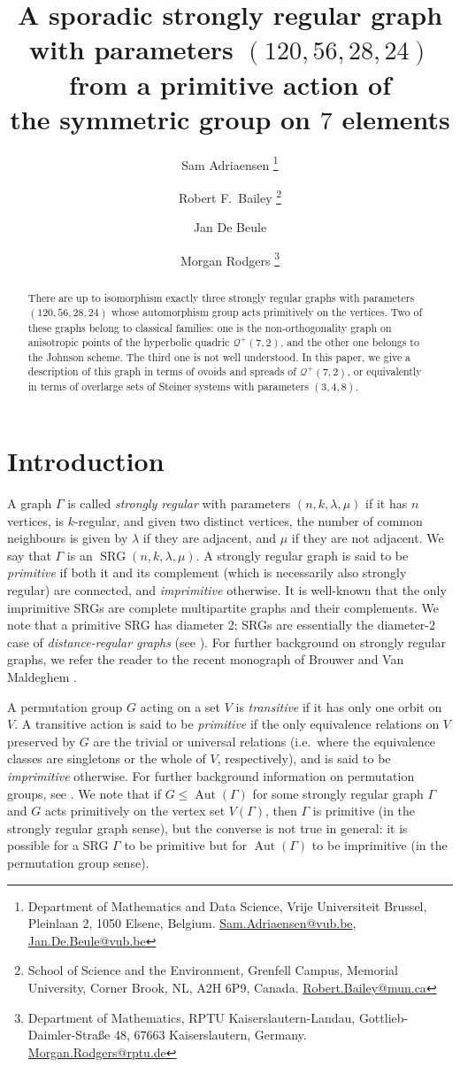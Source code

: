 \documentclass[a4paper]{article}
\title{A sporadic strongly regular graph with parameters $(120,56,28,24)$ from a primitive action of \\ the symmetric group on $7$ elements}
\author{
Sam Adriaensen
   \thanks{Department of Mathematics and Data Science, Vrije Universiteit Brussel, Pleinlaan 2, 1050 Elsene, Belgium.
   \href{mailto:Sam.Adriaensen@vub.be}{Sam.Adriaensen@vub.be}, \href{mailto:Jan.De.Beule@vub.be}{Jan.De.Beule@vub.be}}
\and Robert F.\ Bailey
   \thanks{School of Science and the Environment, Grenfell Campus, Memorial University, Corner Brook, NL, A2H 6P9, Canada. \href{mailto:robert.bailey@mun.ca}{Robert.Bailey@mun.ca}}
\and Jan De Beule
   \footnotemark[1]
\and Morgan Rodgers
   \thanks{Department of Mathematics, RPTU Kaiserslautern-Landau, Gottlieb-Daimler-Straße 48, 67663 Kaiserslautern, Germany.
   \href{mailto:Morgan.Rodgers@rptu.de}{Morgan.Rodgers@rptu.de}
   }
}
\date{}
\theoremstyle{definition}
\renewcommand{\leq}{\leqslant}
\DeclareMathOperator{\SRG}{SRG}
\DeclareMathOperator{\Aut}{Aut}
\begin{document}
\maketitle

\begin{abstract}
 There are up to isomorphism exactly three strongly regular graphs with parameters $(120,56,28,24)$ whose automorphism group acts primitively on the vertices.
 Two of these graphs belong to classical families:
 one is the non-orthogonality graph on anisotropic points of the hyperbolic quadric $\mathcal Q^+(7,2)$, and the other one belongs to the Johnson scheme.
 The third one is not well understood.
 In this paper, we give a description of this graph in terms of ovoids and spreads of $\mathcal Q^+(7,2)$, or equivalently in terms of overlarge sets of Steiner systems with parameters $(3,4,8)$.
\end{abstract}

\section{Introduction}


A graph $\Gamma$ is called \emph{strongly regular} with parameters $(n,k,\lambda,\mu)$ if it has $n$ vertices, is $k$-regular, and given two distinct vertices, the number of common neighbours is given by $\lambda$ if they are adjacent, and $\mu$ if they are not adjacent.
We say that $\Gamma$ is an $\SRG(n,k,\lambda,\mu)$.
A strongly regular graph is said to be \emph{primitive} if both it and its complement (which is necessarily also strongly regular) are connected, and \emph{imprimitive} otherwise. It is well-known that the only imprimitive SRGs are complete multipartite graphs and their complements.  We note that a primitive SRG has diameter 2; SRGs are essentially the diameter-2 case of {\em distance-regular graphs} (see \cite{BCN}).  For further background on strongly regular graphs, we refer the reader to the recent monograph of Brouwer and Van Maldeghem \cite{Brouwer:VanMaldeghem}.

A permutation group $G$ acting on a set $V$ is \emph{transitive} if it has only one orbit on $V$.  A transitive action is said to be \emph{primitive} if the only equivalence relations on $V$ preserved by $G$ are the trivial or universal relations (i.e.\ where the equivalence classes are singletons or the whole of $V$, respectively), and is said to be \emph{imprimitive} otherwise.  For further background information on permutation groups, see \cite{Cameron}.
We note that if $G\leq\Aut(\Gamma)$ for some strongly regular graph $\Gamma$ and $G$ acts primitively on the vertex set $V(\Gamma)$, then $\Gamma$ is primitive (in the strongly regular graph sense), but the converse is not true in general: it is possible for a SRG $\Gamma$ to be primitive but for $\Aut(\Gamma)$ to be imprimitive (in the permutation group sense).
\end{document}
